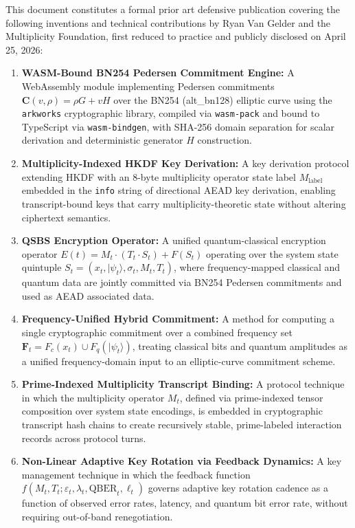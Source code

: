 \documentclass[11pt,letterpaper]{article}
\begin{document}
This document constitutes a formal prior art defensive publication covering the
following inventions and technical contributions by Ryan Van Gelder and the
Multiplicity Foundation, first reduced to practice and publicly disclosed on
April 25, 2026:

\begin{enumerate}[leftmargin=*]
  \item \textbf{WASM-Bound BN254 Pedersen Commitment Engine:} A WebAssembly
        module implementing Pedersen commitments \(\mathbf{C}(v,\rho) = \rho G + vH\)
        over the BN254 (alt\_bn128) elliptic curve using the \texttt{arkworks}
        cryptographic library, compiled via \texttt{wasm-pack} and bound to
        TypeScript via \texttt{wasm-bindgen}, with SHA-256 domain separation for
        scalar derivation and deterministic generator \(H\) construction.

  \item \textbf{Multiplicity-Indexed HKDF Key Derivation:} A key derivation
        protocol extending HKDF with an 8-byte multiplicity operator state label
        \(M_{\text{label}}\) embedded in the \texttt{info} string of directional
        AEAD key derivation, enabling transcript-bound keys that carry
        multiplicity-theoretic state without altering ciphertext semantics.

  \item \textbf{QSBS Encryption Operator:} A unified quantum-classical encryption
        operator \(E(t) = M_t \cdot (T_t \cdot S_t) + F(S_t)\) operating over the
        system state quintuple \(S_t = (x_t, |\psi_t\rangle, \sigma_t, M_t, T_t)\),
        where frequency-mapped classical and quantum data are jointly committed via
        BN254 Pedersen commitments and used as AEAD associated data.

  \item \textbf{Frequency-Unified Hybrid Commitment:} A method for computing a
        single cryptographic commitment over a combined frequency set
        \(\mathbf{F}_t = F_c(x_t) \cup F_q(|\psi_t\rangle)\), treating classical
        bits and quantum amplitudes as a unified frequency-domain input to an
        elliptic-curve commitment scheme.

  \item \textbf{Prime-Indexed Multiplicity Transcript Binding:} A protocol technique
        in which the multiplicity operator \(M_t\), defined via prime-indexed tensor
        composition over system state encodings, is embedded in cryptographic
        transcript hash chains to create recursively stable, prime-labeled interaction
        records across protocol turns.

  \item \textbf{Non-Linear Adaptive Key Rotation via Feedback Dynamics:} A key
        management technique in which the feedback function
        \(f(M_t, T_t; \varepsilon_t, \lambda_t, \text{QBER}_t, \ell_t)\) governs
        adaptive key rotation cadence as a function of observed error rates, latency,
        and quantum bit error rate, without requiring out-of-band renegotiation.
\end{enumerate}
\end{document}
